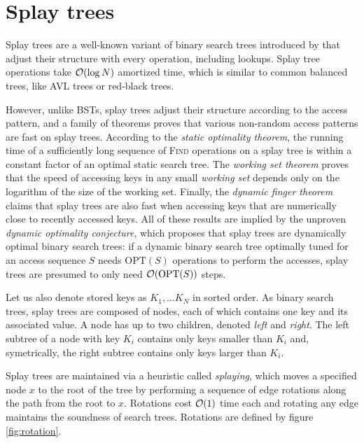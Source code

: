 \chapter{Splay trees}
\label{chapter:splay}
Splay trees are a well-known variant of binary search trees introduced
by \cite{splay} that adjust their structure with every operation, including
lookups. Splay tree operations take $\mathcal{O}(\log N)$ amortized time, which is
similar to common balanced trees, like AVL trees or red-black trees.

However, unlike BSTs, splay trees adjust their structure
according to the access pattern, and a family of theorems proves that
various non-random access patterns are fast on splay trees.
According to the \emph{static optimality theorem}, the running time
of a sufficiently long sequence of \textsc{Find} operations on a splay tree
is within a constant factor of an optimal static search tree.
The \emph{working set theorem} proves that the speed of accessing keys in
any small \emph{working set} depends only on the logarithm of the size
of the working set.
Finally, the \emph{dynamic finger theorem} claims that splay trees are also
fast when accessing keys that are numerically close to recently accessed keys.
All of these results are implied by the unproven \emph{dynamic optimality
conjecture}, which proposes that splay trees are dynamically optimal binary
search trees: if a dynamic binary search tree optimally tuned for an access
sequence $S$ needs $\mathrm{OPT}(S)$ operations to perform the accesses, splay
trees are presumed to only need $\mathcal{O}(\mathrm{OPT}(S))$ steps.

Let us also denote stored keys as $K_1,\ldots K_N$ in sorted order.
As binary search trees, splay trees are composed of nodes, each of which
contains one key and its associated value. A node has up to two children,
denoted \emph{left} and \emph{right}.
The left subtree of a node with key $K_i$ contains only keys smaller than $K_i$
and, symetrically, the right subtree contains only keys larger than $K_i$.

Splay trees are maintained via a heuristic called \emph{splaying}, which
moves a specified node $x$ to the root of the tree by performing a sequence
of edge rotations along the path from the root to $x$.
Rotations cost $\mathcal{O}(1)$ time each and rotating any edge maintains
the soundness of search trees. Rotations are defined by figure
\ref{fig:rotation}.

\newcommand{\hunk}[2]{ node [splay_hunk] (hunk#1-#2) {#1} }

